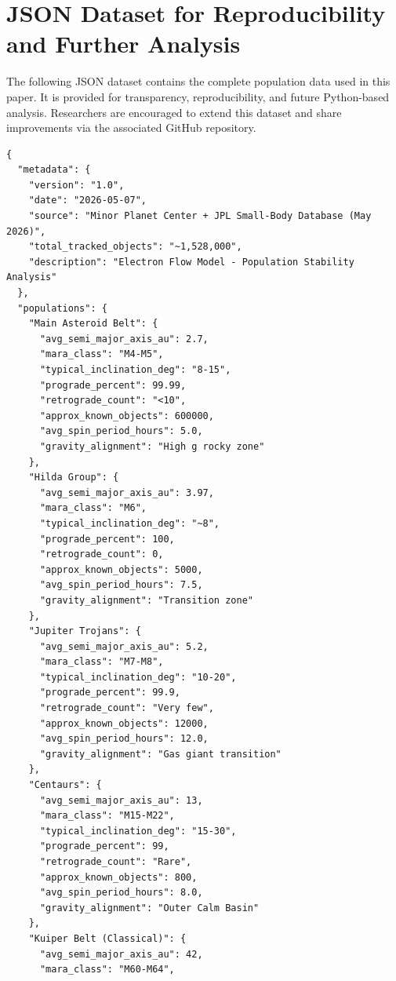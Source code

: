 \documentclass[11pt, a4paper]{article}
\begin{document}
\clearpage
\appendix
\section{JSON Dataset for Reproducibility and Further Analysis}

The following JSON dataset contains the complete population data used in this paper. It is provided for transparency, reproducibility, and future Python-based analysis. Researchers are encouraged to extend this dataset and share improvements via the associated GitHub repository.

\begin{lstlisting}[caption=Electron Flow Model Population Dataset (ready for GitHub + Python)]
{
  "metadata": {
    "version": "1.0",
    "date": "2026-05-07",
    "source": "Minor Planet Center + JPL Small-Body Database (May 2026)",
    "total_tracked_objects": "~1,528,000",
    "description": "Electron Flow Model - Population Stability Analysis"
  },
  "populations": {
    "Main Asteroid Belt": {
      "avg_semi_major_axis_au": 2.7,
      "mara_class": "M4-M5",
      "typical_inclination_deg": "8-15",
      "prograde_percent": 99.99,
      "retrograde_count": "<10",
      "approx_known_objects": 600000,
      "avg_spin_period_hours": 5.0,
      "gravity_alignment": "High g rocky zone"
    },
    "Hilda Group": {
      "avg_semi_major_axis_au": 3.97,
      "mara_class": "M6",
      "typical_inclination_deg": "~8",
      "prograde_percent": 100,
      "retrograde_count": 0,
      "approx_known_objects": 5000,
      "avg_spin_period_hours": 7.5,
      "gravity_alignment": "Transition zone"
    },
    "Jupiter Trojans": {
      "avg_semi_major_axis_au": 5.2,
      "mara_class": "M7-M8",
      "typical_inclination_deg": "10-20",
      "prograde_percent": 99.9,
      "retrograde_count": "Very few",
      "approx_known_objects": 12000,
      "avg_spin_period_hours": 12.0,
      "gravity_alignment": "Gas giant transition"
    },
    "Centaurs": {
      "avg_semi_major_axis_au": 13,
      "mara_class": "M15-M22",
      "typical_inclination_deg": "15-30",
      "prograde_percent": 99,
      "retrograde_count": "Rare",
      "approx_known_objects": 800,
      "avg_spin_period_hours": 8.0,
      "gravity_alignment": "Outer Calm Basin"
    },
    "Kuiper Belt (Classical)": {
      "avg_semi_major_axis_au": 42,
      "mara_class": "M60-M64",

\end{lstlisting}
\end{document}
